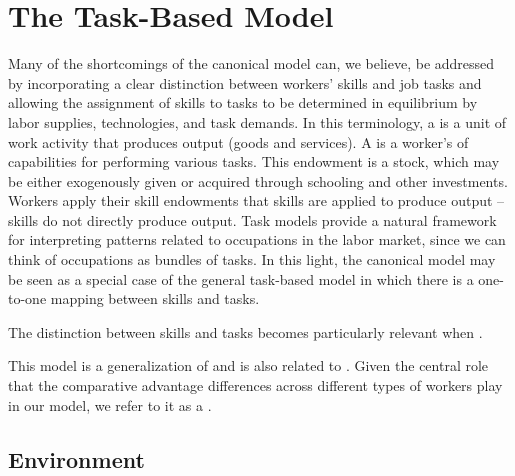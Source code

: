 \documentclass[12pt]{article}
\newcommand{\highlightB}[1]{{\emph{\color{MyBlue}{#1}}}}
\newcommand{\highlightP}[1]{{\emph{\color{MyPink}{#1}}}}
\theoremstyle{definition}
\begin{document}
\section{The Task-Based Model}

Many of the shortcomings of the canonical model can, we believe, be addressed by incorporating a clear distinction between workers' skills and job tasks and allowing the assignment of skills to tasks to be determined in equilibrium by labor supplies, technologies, and task demands. In this terminology, a \highlightB{task} is a unit of work activity that produces output (goods and services). A \highlightB{skill} is a worker's \highlightP{endowment} of capabilities for performing various tasks. This endowment is a stock, which may be either exogenously given or acquired through schooling and other investments. Workers apply their skill endowments that skills are applied to produce output -- skills do not directly produce output. Task models provide a natural framework for interpreting patterns related to occupations in the labor market, since we can think of occupations as bundles of tasks. In this light, the canonical model may be seen as a special case of the general task-based model in which there is a one-to-one mapping between skills and tasks. 

The distinction between skills and tasks becomes particularly relevant when \highlightB{workers of a given skill level can perform a variety of tasks and, moreover, can change the set of tasks that they perform in response to changes in labor market conditions and technology}.

This model is a generalization of \citet{acemogluProductivityDifferences2001} and is also related to \citet{costinotMatchingInequalityWorld2010}. Given the central role that the comparative advantage differences across different types of workers play in our model, we refer to it as a \highlightB{Ricardian model of the labor market}.

\subsection{Environment}
\end{document}
